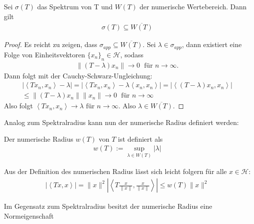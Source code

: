 \begin{thm} \label{thm:spect_incl}
	Sei $\sigma(T)$ das Spektrum von T und $W(T)$ der numerische Wertebereich. Dann gilt
	\begin{align*}
		\sigma(T) \subseteq \overline{W(T)}
	\end{align*}
\end{thm}
\begin{proof}
Es reicht zu zeigen, dass $\sigma_{app} \subseteq \overline{W(T)}$. Sei $\lambda \in \sigma_{app}$, dann existiert eine Folge von Einheitsvektoren $\{x_n\}_n \in \mathcal{H}$, sodass \begin{align*}
	\| (T-\lambda)x_n \| \rightarrow 0 \;\text{ für $n \rightarrow \infty$} .
\end{align*}
Dann folgt mit der Cauchy-Schwarz-Ungleichung:
\begin{align*}
	|\left< Tx_n, x_n \right> - \lambda | = |\left< Tx_n, x_n \right> - \lambda  \left<x_n, x_n \right> | = | \left< (T-\lambda)x_n, x_n \right> | \\ 
	\le \| (T-\lambda)x_n \| \|x_n \| \rightarrow 0 \; \text{ für $n \rightarrow \infty$}
\end{align*}
Also folgt $\left< Tx_n, x_n \right> \rightarrow \lambda$$\text{ für $n \rightarrow \infty$}$. Also $\lambda \in \overline{W(T)}$.
\end{proof}


Analog zum Spektralradius kann nun der numerische Radius definiert werden:
\begin{definition}
	Der numerische Radius $w(T)$ von $T$ ist definiert als
	\begin{align*}
		w(T) := \sup_{\lambda \in W(T)} |\lambda|
	\end{align*}
\end{definition}

\begin{rem} \label{rem:ineq_rad}
	Aus der Definition des numerischen Radius lässt sich leicht folgern für alle $x \in \mathcal{H}$:
	\begin{align}
		|\left< Tx,x \right> |= \|x \|^2 |\left< T \frac{x}{\|x \|}, \frac{x}{\|x \|} \right> |\le w(T) \|x \|^2
	\end{align}
\end{rem}

Im Gegensatz zum Spektralradius besitzt der numerische Radius eine Normeigenschaft \parencite[vgl.][]{pearcy1966elementary}


